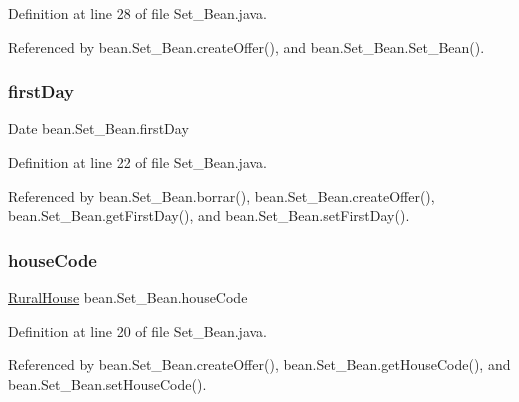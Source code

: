 Definition at line 28 of file Set\+\_\+\+Bean.\+java.



Referenced by bean.\+Set\+\_\+\+Bean.\+create\+Offer(), and bean.\+Set\+\_\+\+Bean.\+Set\+\_\+\+Bean().

\mbox{\label{classbean_1_1Set__Bean_a5f403451f5e63a57aa62d0ea72fb020b}} 
\subsubsection{\texorpdfstring{firstDay}{firstDay}}
{\footnotesize\ttfamily Date bean.\+Set\+\_\+\+Bean.\+first\+Day\hspace{0.3cm}{\ttfamily [private]}}



Definition at line 22 of file Set\+\_\+\+Bean.\+java.



Referenced by bean.\+Set\+\_\+\+Bean.\+borrar(), bean.\+Set\+\_\+\+Bean.\+create\+Offer(), bean.\+Set\+\_\+\+Bean.\+get\+First\+Day(), and bean.\+Set\+\_\+\+Bean.\+set\+First\+Day().

\mbox{\label{classbean_1_1Set__Bean_a80c8bf1baec6aa3305f06e8f34c4905d}} 
\subsubsection{\texorpdfstring{houseCode}{houseCode}}
{\footnotesize\ttfamily \mbox{\hyperlink{classdomain_1_1RuralHouse}{Rural\+House}} bean.\+Set\+\_\+\+Bean.\+house\+Code\hspace{0.3cm}{\ttfamily [private]}}



Definition at line 20 of file Set\+\_\+\+Bean.\+java.



Referenced by bean.\+Set\+\_\+\+Bean.\+create\+Offer(), bean.\+Set\+\_\+\+Bean.\+get\+House\+Code(), and bean.\+Set\+\_\+\+Bean.\+set\+House\+Code().

\mbox{\label{classbean_1_1Set__Bean_af99beccb4531fab9e9e96b5277ea4b6c}} 
